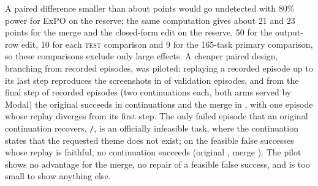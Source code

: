 A paired difference smaller than about \onMde{} points would go undetected with 80\% power for ExPO on the reserve; the same computation gives about 21 and 23 points for the merge and the closed-form edit on the reserve, 50 for the output-row edit, 10 for each \textsc{test} comparison and 9 for the 165-task primary comparison, so these comparisons exclude only large effects. %
A cheaper paired design, branching from recorded episodes, was piloted: replaying a recorded episode up to its last step reproduces the screenshots in \brValidOk{} of \brValidN{} validation episodes, and from the final step of \brEpisodes{} recorded episodes (two continuations each, both arms served by Modal) the original succeeds in \brOrig{} continuations and the merge in \brCand, with one episode whose replay diverges from its first step. The only failed episode that an original continuation recovers, \texttt{\brRepairDomain/\brRepairTask}, is an officially infeasible task, where the continuation states that the requested theme does not exist; on the feasible false successes whose replay is faithful, no continuation succeeds (original \brFeasFalseOrig, merge \brFeasFalseCand). The pilot shows no advantage for the merge, no repair of a feasible false success, and is too small to show anything else. %
